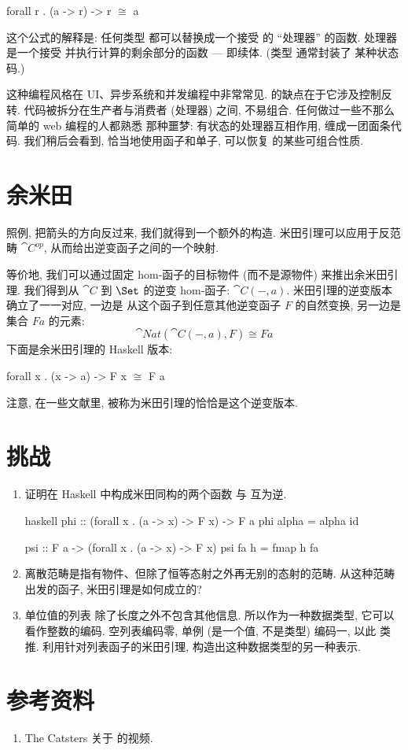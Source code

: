 \begin{snipv}
forall r . (a -> r) -> r \ensuremath{\cong} a
\end{snipv}
这个公式的解释是: 任何类型  都可以替换成一个接受  的 ``处理器'' 的函数.
处理器是一个接受  并执行计算的剩余部分的函数 --- 即续体. (类型  通常封装了
某种状态码.)

这种编程风格在 UI、异步系统和并发编程中非常常见.  的缺点在于它涉及控制反转.
代码被拆分在生产者与消费者 (处理器) 之间, 不易组合. 任何做过一些不那么简单的 web 编程的人都熟悉
那种噩梦: 有状态的处理器互相作用, 缠成一团面条代码. 我们稍后会看到, 恰当地使用函子和单子,
可以恢复  的某些可组合性质.

\section{余米田}

照例, 把箭头的方向反过来, 我们就得到一个额外的构造. 米田引理可以应用于反范畴 $\cat{C}^{op}$,
从而给出逆变函子之间的一个映射.

等价地, 我们可以通过固定 hom-函子的目标物件 (而不是源物件) 来推出余米田引理. 我们得到从
$\cat{C}$ 到 $\Set$ 的逆变 hom-函子: $\cat{C}(-, a)$. 米田引理的逆变版本确立了一一对应, 一边是
从这个函子到任意其他逆变函子 $F$ 的自然变换, 另一边是集合 $F a$ 的元素:
\[\cat{Nat}(\cat{C}(-, a), F) \cong F a\]
下面是余米田引理的 Haskell 版本:

\begin{snipv}
forall x . (x -> a) -> F x \ensuremath{\cong} F a
\end{snipv}
注意, 在一些文献里, 被称为米田引理的恰恰是这个逆变版本.

\section{挑战}

\begin{enumerate}
  \tightlist
  \item
        证明在 Haskell 中构成米田同构的两个函数  与  互为逆.

        \begin{snip}{haskell}
phi :: (forall x . (a -> x) -> F x) -> F a
phi alpha = alpha id

psi :: F a -> (forall x . (a -> x) -> F x)
psi fa h = fmap h fa
\end{snip}
  \item
        离散范畴是指有物件、但除了恒等态射之外再无别的态射的范畴. 从这种范畴出发的函子,
        米田引理是如何成立的?
  \item
        单位值的列表 \code{{[}(){]}} 除了长度之外不包含其他信息. 所以作为一种数据类型, 它可以
        看作整数的编码. 空列表编码零, 单例 \code{{[}(){]}} (是一个值, 不是类型) 编码一, 以此
        类推. 利用针对列表函子的米田引理, 构造出这种数据类型的另一种表示.
\end{enumerate}

\section{参考资料}

\begin{enumerate}
  \tightlist
  \item
        The Catsters 关于
        的视频.
\end{enumerate}
